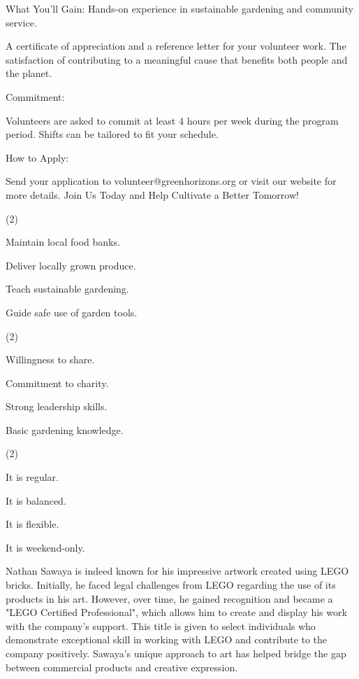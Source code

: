 \documentclass{英语试卷}
\begin{document}
\par What You'll Gain: Hands-on experience in sustainable gardening and community service.\par
\par A certificate of appreciation and a reference letter for your volunteer work. The satisfaction of contributing to a meaningful cause that benefits both people and the planet.\par
\par Commitment:\par
\par Volunteers are asked to commit at least 4 hours per week during the program period. Shifts can be tailored to fit your schedule.\par
\par How to Apply:\par
\par Send your application to volunteer@greenhorizons.org or visit our website for more details. Join Us Today and Help Cultivate a Better Tomorrow!\par
{}
\begin{choices}(2)
  \item Maintain local food banks.
  \item Deliver locally grown produce.
  \item Teach sustainable gardening.
  \item Guide safe use of garden tools.
\end{choices}
\begin{choices}(2)
  \item Willingness to share.
  \item Commitment to charity.
  \item Strong leadership skills.
  \item Basic gardening knowledge.
\end{choices}
\begin{choices}(2)
  \item It is regular.
  \item It is balanced.
  \item It is flexible.
  \item It is weekend-only.
\end{choices}
\par Nathan Sawaya is indeed known for his impressive artwork created using LEGO bricks. Initially, he faced legal challenges from LEGO regarding the use of its products in his art. However, over time, he gained recognition and became a "LEGO Certified Professional", which allows him to create and display his work with the company's support. This title is given to select individuals who demonstrate exceptional skill in working with LEGO and contribute to the company positively. Sawaya's unique approach to art has helped bridge the gap between commercial products and creative expression.\par
\end{document}
